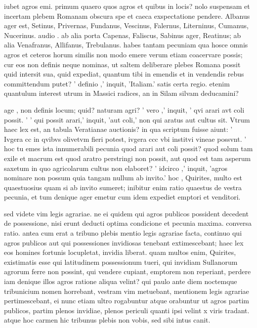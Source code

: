 iubet agros emi. primum quaero quos agros et quibus in locis? nolo suspensam et incertam plebem Romanam obscura spe et caeca exspectatione pendere. Albanus ager est, Setinus, Privernas, Fundanus, Vescinus, Falernus, Literninus, Cumanus, Nucerinus. audio . ab alia porta Capenas, Faliscus, Sabinus ager, Reatinus; ab alia Venafranus, Allifanus, Trebulanus. habes tantam pecuniam qua hosce omnis agros et ceteros horum similis non modo emere verum etiam coacervare possis; cur eos non definis neque nominas, ut saltem deliberare plebes Romana possit quid intersit sua, quid expediat, quantum tibi in emendis et in vendendis rebus committendum putet? ' definio ,' inquit, 'Italiam.' satis certa regio. etenim quantulum interest utrum in Massici radices, an in Silam silvam deducamini?

 age , non definis locum; quid? naturam agri? ' vero ,' inquit, ' qvi arari avt coli possit. ' ' qui possit arari,' inquit, 'aut coli,' non qui aratus aut cultus sit. Vtrum haec lex est, an tabula Veratianae auctionis? in qua scriptum fuisse aiunt: ' Ivgera cc in qvibvs olivetvm fieri potest, ivgera ccc vbi institvi vineae possvnt. ' hoc tu emes ista innumerabili pecunia quod arari aut coli possit? quod solum tam exile et macrum est quod aratro perstringi non possit, aut quod est tam asperum saxetum in quo agricolarum cultus non elaboret? ' idcirco ,' inquit, 'agros nominare non possum quia tangam nullum ab invito.' hoc , Quirites, multo est quaestuosius quam si ab invito sumeret; inibitur enim ratio quaestus de vestra pecunia, et tum denique ager emetur cum idem expediet emptori et venditori.

 sed videte vim legis agrariae. ne ei quidem qui agros publicos possident decedent de possessione, nisi erunt deducti optima condicione et pecunia maxima. conversa ratio. antea cum erat a tribuno plebis mentio legis agrariae facta, continuo qui agros publicos aut qui possessiones invidiosas tenebant extimescebant; haec lex eos homines fortunis locupletat, invidia liberat. quam multos enim, Quirites, existimatis esse qui latitudinem possessionum tueri, qui invidiam Sullanorum agrorum ferre non possint, qui vendere cupiant, emptorem non reperiant, perdere iam denique illos agros ratione aliqua velint? qui paulo ante diem noctemque tribunicium nomen horrebant, vestram vim metuebant, mentionem legis agrariae pertimescebant, ei nunc etiam ultro rogabuntur atque orabuntur ut agros partim publicos, partim plenos invidiae, plenos periculi quanti ipsi velint x viris tradant. atque hoc carmen hic tribunus plebis non vobis, sed sibi intus canit.

